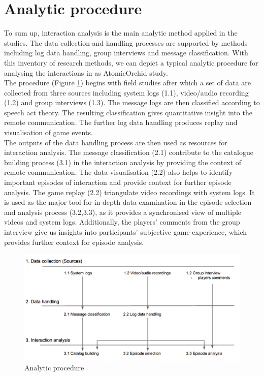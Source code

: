 \section{Analytic procedure}
To sum up, interaction analysis is the main analytic method applied in the studies. The data collection and handling processes are supported by methods including log data handling, group interviews and message classification. With this inventory of research methods, we can depict a typical analytic procedure for analysing the interactions in as AtomicOrchid study. \\

The procedure (Figure \ref{fig:analyticprocedure}) begins with field studies after which a set of data are collected from three sources including system logs (1.1), video/audio recording (1.2) and group interviews (1.3). The message logs are then classified according to speech act theory. The resulting classification gives quantitative insight into the remote communication. The further log data handling produces replay and visualisation of game events. \\

The outputs of the data handling process are then used as resources for interaction analysis. The message classification (2.1) contribute to the catalogue building process (3.1) in the interaction analysis by providing the context of remote communication. The data visualisation (2.2) also helps to identify important episodes of interaction and provide context for further episode analysis. The game replay (2.2) triangulate video recordings with system logs. It is used as the major tool for in-depth data examination in the episode selection and analysis process (3.2,3.3), as it provides a synchronised view of multiple videos and system logs. Additionally, the players' comments from the group interview give us insights into participants' subjective game experience, which provides further context for episode analysis.\\



\begin{figure}[h]
  \centering
  \includegraphics[width=1\textwidth]{img/methodology/analyticprocedure}
  \caption{Analytic procedure}
  \label{fig:analyticprocedure}
\end{figure}

